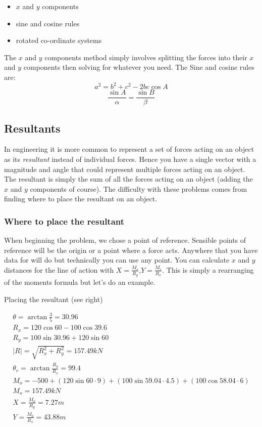 \documentclass[a4paper, 12pt]{article}
\begin{document}
\begin{itemize}
    \item $x$ and $y$ components 
    \item sine and cosine rules
    \item rotated co-ordinate systems
\end{itemize}
The $x$ and $y$ components method simply involves splitting the forces into their $x$ and $y$ components then solving
for whatever you need. The Sine and cosine rules are:
\begin{equation*}
    a^2 = b^2 + c^2 - 2bc\cos{A} 
\end{equation*}
\begin{equation*}
    \frac{\sin{A}}{\alpha} = \frac{\sin{B}}{\beta} 
\end{equation*}

\subsection{Resultants}
In engineering it is more common to represent a set of forces acting on an object as its \textit{resultant} instead of individual forces.
Hence you have a single vector with a magnitude and angle that could represent multiple forces acting on an object. 
The resultant is simply the sum of all the forces acting on an object (adding the $x$ and $y$ components of course). 
The difficulty with these problems comes from finding where to place the resultant on an object.
\subsubsection{Where to place the resultant} 
When beginning the problem, we chose a point of reference.
Sensible points of reference will be the origin or a point where a force acts.
Anywhere that you have data for will do but technically you can use any point.
You can calculate $x$ and $y$ distances for the line of action with $X=\frac{M_r}{R_y}$,$Y=\frac{M_r}{R_x}$.
This is simply a rearranging of the moments formula but let's do an example.

\begin{example}
Placing the resultant (see right)
\marginnote{\texttt{[image: 4]}}
\begin{center}
\begin{gather*}
    \theta = \arctan{\frac{3}{5}} = 30.96 \\
    R_x = 120\cos{60} - 100\cos{39.6} \\
    R_y = 100\sin{30.96} + 120\sin{60} \\
    |R| = \sqrt{R_x^2+R_y^2} = 157.49\unit{kN} \\
    \theta_r = \arctan{\frac{R_y}{R_x}} = 99.4 \\
    M_o = -500 + (120\sin{60}\cdot9) + (100\sin{59.04}\cdot4.5) + (100\cos{58.04}\cdot6) \\
    M_o = 157.49\unit{kN} \\
    X = \frac{M_0}{R_y} = 7.27\unit{m} \\
    Y = \frac{M_0}{R_x} = 43.88\unit{m} 
\end{gather*}
\end{center}
\end{example}
\end{document}
